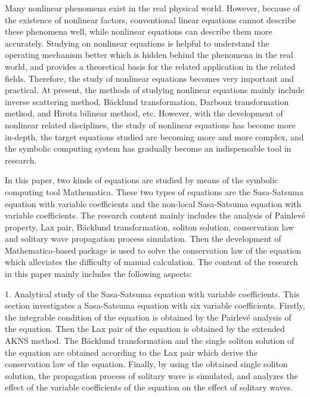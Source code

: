 \begin{eabstract}
Many nonlinear phenomena exist in the real physical world. However, because of the existence of nonlinear factors, conventional linear equations cannot describe these phenomena well, while nonlinear equations can describe them more accurately. Studying on nonlinear equations is helpful to understand the operating mechanism better which is hidden behind the phenomena in the real world, and provides a theoretical basis for the related application in the related fields. Therefore, the study of nonlinear equations becomes very important and practical.  At present, the methods of studying nonlinear equations mainly include inverse scattering method, B\"{a}cklund transformation, Darboux transformation method, and Hirota bilinear method, etc.  However, with the development of nonlinear related disciplines, the study of nonlinear equations has become more
in-depth, the target equations studied are becoming more and more complex, and the symbolic computing system has gradually become an indispensable tool in research.

In this paper, two kinds of equations are studied by means of the symbolic computing tool Mathematica. These two types of equations are the Sasa-Satsuma equation with variable coefficients and the non-local Sasa-Satsuma equation with variable coefficients. The research content mainly includes the analysis of Painlev\'{e} property, Lax pair, B\"{a}cklund transformation, soliton solution, conservation law and solitary wave propagation process simulation. Then the development of Mathematica-based package is used to solve the conservation law of the equation which alleviates the difficulty of manual calculation. The content of the research in this paper mainly includes the following aspects:

1. Analytical study of the Sasa-Satsuma equation with variable coefficients.
This section investigates a Sasa-Satsuma equation with six variable coefficients. Firstly, the integrable condition of the equation is obtained by the Pairlev\'{e} analysis of the equation. Then the Lax pair of the equation is obtained by the extended AKNS method. The B\"{a}cklund transformation and the single soliton solution of the equation are obtained according to the Lax pair which derive the conservation law of the equation. Finally, by using the obtained single soliton solution, the propagation process of solitary wave is simulated, and analyzes the effect of the variable coefficients of the equation on the effect of solitary waves.


\end{eabstract}
